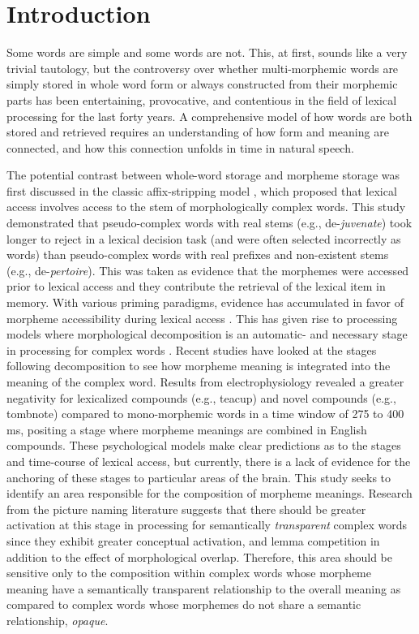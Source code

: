 \documentclass{frontiersSCNS}
\begin{document}
\section{Introduction}

	Some words are simple and some words are not. This, at first, sounds like a very trivial tautology, but the controversy over whether multi-morphemic words are simply stored in whole word form \citep*{Butterworth:1983, Giraudo:2001} or always constructed from their morphemic parts \citep*{Taft:2004} has been entertaining, provocative, and contentious in the field of lexical processing for the last forty years. A comprehensive model of how words are both stored and retrieved requires an understanding of how form and meaning are connected, and how this connection unfolds in time in natural speech. 

	The potential contrast between whole-word storage and morpheme storage was first discussed in the classic affix-stripping model \citep*{Taft:1975}, which proposed that lexical access involves access to the stem of morphologically complex words. This study demonstrated that pseudo-complex words with real stems (e.g., de-\textit{juvenate}) took longer to reject in a lexical decision task (and were often selected incorrectly as words) than pseudo-complex words with real prefixes and non-existent stems (e.g., de-\textit{pertoire}). This was taken as evidence that the morphemes were accessed prior to lexical access and they contribute the retrieval of the lexical item in memory. With various priming paradigms, evidence has accumulated in favor of morpheme accessibility during lexical access  \citep*{Taft:2004, Marslen-Wilson:1994, Rastle:2003}. This has given rise to processing models where morphological decomposition is an automatic- and necessary stage in processing for complex words \citep*{Rastle:2004}. Recent studies \citep*{Fiorentino:2013, Semenza:2014} have looked at the stages following decomposition to see how morpheme meaning is integrated into the meaning of the complex word. Results from electrophysiology \citep{Fiorentino:2013} revealed a greater negativity for lexicalized compounds (e.g., teacup) and novel compounds (e.g., tombnote) compared to mono-morphemic words in a time window of 275 to 400 ms, positing a stage where morpheme meanings are combined in English compounds. These psychological models make clear predictions as to the stages and time-course of lexical access, but currently, there is a lack of evidence for the anchoring of these stages to particular areas of the brain. This study seeks to identify an area responsible for the composition of morpheme meanings. Research from the picture naming literature \citep*{Dohmes:2004} suggests that there should be greater activation at this stage in processing for semantically \textit{transparent} complex words since they exhibit greater conceptual activation, and lemma competition in addition to the effect of morphological overlap. Therefore, this area should be sensitive only to the composition within complex words whose morpheme meaning have a semantically transparent relationship to the overall meaning as compared to complex words whose morphemes do not share a semantic relationship, \textit{opaque}.
\end{document}
